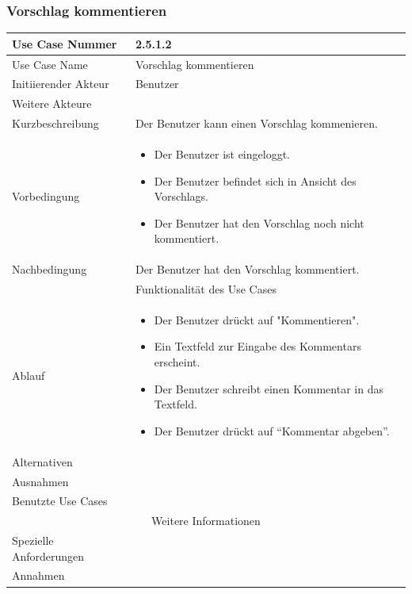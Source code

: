 \documentclass[10pt,a4paper]{article}
\begin{document}
\subsubsection{Vorschlag kommentieren}
	\begin{tabular}{|l|p{.5\linewidth}|}
	\hline Use Case Nummer & 2.5.1.2 \\ 
	\hline Use Case Name & Vorschlag kommentieren \\ 
	\hline Initiierender Akteur & Benutzer \\
	\hline Weitere Akteure &  \\
	\hline Kurzbeschreibung & Der Benutzer kann einen Vorschlag kommenieren. \\
	\hline Vorbedingung & \begin{itemize}
        	\item Der Benutzer ist eingeloggt.
                \item Der Benutzer befindet sich in Ansicht des Vorschlags.
                \item Der Benutzer hat den Vorschlag noch nicht kommentiert.
                \end{itemize} \\
	\hline Nachbedingung & Der Benutzer hat den Vorschlag kommentiert. \\
	\hline \multicolumn{2}{|c|}{Funktionalität des Use Cases}\\
	\hline Ablauf & \begin{itemize}
		\item Der Benutzer drückt auf "Kommentieren".
                \item Ein Textfeld zur Eingabe des Kommentars erscheint.
		\item Der Benutzer schreibt einen Kommentar in das Textfeld.
		\item Der Benutzer drückt auf ``Kommentar abgeben''.
	\end{itemize} \\
	\hline Alternativen &  \\
	\hline Ausnahmen &  \\
	\hline Benutzte Use Cases &  \\
	\hline \multicolumn{2}{|c|}{Weitere Informationen} \\
	\hline Spezielle Anforderungen &  \\
	\hline Annahmen &  \\
	\hline
	\end{tabular}
\end{document}
